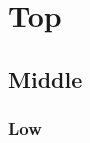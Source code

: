 \documentclass{article}
\begin{document}
\section{Top}
\subsection{Middle}
\subsubsection{Low}
\end{document}
